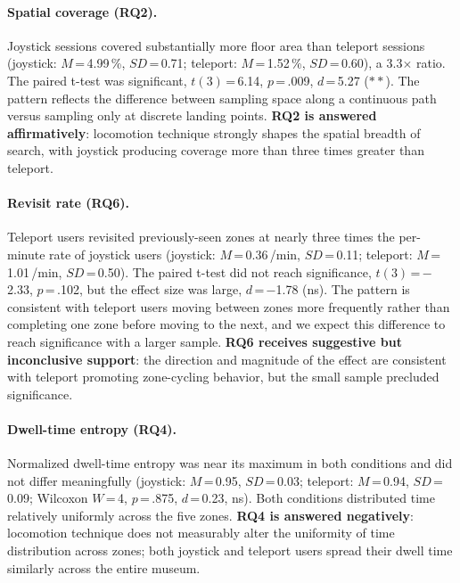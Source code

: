 \documentclass{vgtc}
\begin{document}
\paragraph{Spatial coverage (RQ2).}
Joystick sessions covered substantially more floor area than teleport sessions (joystick: $M$\,=\,4.99\,\%, $SD$\,=\,0.71; teleport: $M$\,=\,1.52\,\%, $SD$\,=\,0.60), a 3.3$\times$ ratio. The paired t-test was significant, $t(3)$\,=\,6.14, $p$\,=\,.009, $d$\,=\,5.27 ($\ast\ast$). The pattern reflects the difference between sampling space along a continuous path versus sampling only at discrete landing points. \textbf{RQ2 is answered affirmatively}: locomotion technique strongly shapes the spatial breadth of search, with joystick producing coverage more than three times greater than teleport.

\paragraph{Revisit rate (RQ6).}
Teleport users revisited previously-seen zones at nearly three times the per-minute rate of joystick users (joystick: $M$\,=\,0.36\,/min, $SD$\,=\,0.11; teleport: $M$\,=\,1.01\,/min, $SD$\,=\,0.50). The paired t-test did not reach significance, $t(3)$\,=\,$-$2.33, $p$\,=\,.102, but the effect size was large, $d$\,=\,$-$1.78 (ns). The pattern is consistent with teleport users moving between zones more frequently rather than completing one zone before moving to the next, and we expect this difference to reach significance with a larger sample. \textbf{RQ6 receives suggestive but inconclusive support}: the direction and magnitude of the effect are consistent with teleport promoting zone-cycling behavior, but the small sample precluded significance.

\paragraph{Dwell-time entropy (RQ4).}
Normalized dwell-time entropy was near its maximum in both conditions and did not differ meaningfully (joystick: $M$\,=\,0.95, $SD$\,=\,0.03; teleport: $M$\,=\,0.94, $SD$\,=\,0.09; Wilcoxon $W$\,=\,4, $p$\,=\,.875, $d$\,=\,0.23, ns). Both conditions distributed time relatively uniformly across the five zones. \textbf{RQ4 is answered negatively}: locomotion technique does not measurably alter the uniformity of time distribution across zones; both joystick and teleport users spread their dwell time similarly across the entire museum.
\end{document}
